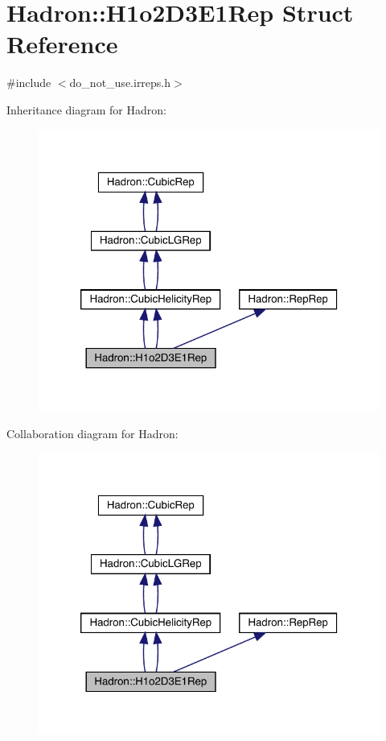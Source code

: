 \hypertarget{structHadron_1_1H1o2D3E1Rep}{}\section{Hadron\+:\+:H1o2\+D3\+E1\+Rep Struct Reference}
\label{structHadron_1_1H1o2D3E1Rep}


{\ttfamily \#include $<$do\+\_\+not\+\_\+use.\+irreps.\+h$>$}



Inheritance diagram for Hadron\+:\nopagebreak
\begin{figure}[H]
\begin{center}
\leavevmode
\includegraphics[width=320pt]{d5/d50/structHadron_1_1H1o2D3E1Rep__inherit__graph}
\end{center}
\end{figure}


Collaboration diagram for Hadron\+:\nopagebreak
\begin{figure}[H]
\begin{center}
\leavevmode
\includegraphics[width=320pt]{df/da8/structHadron_1_1H1o2D3E1Rep__coll__graph}
\end{center}
\end{figure}
